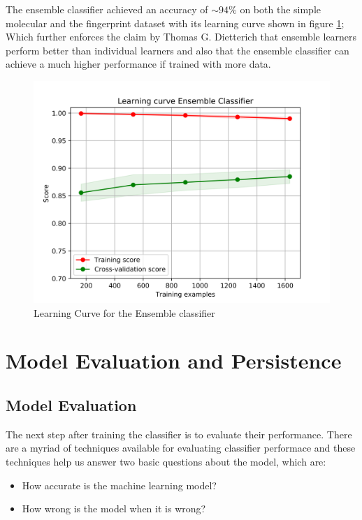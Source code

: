 \documentclass[a4paper,12pt]{report}
\begin{document}
		The ensemble classifier achieved an accuracy of $\sim94\%$ on both the simple molecular and the fingerprint dataset with its learning curve shown in figure \ref{fig:learning_curve_ensemble}; Which further enforces the claim by Thomas G. Dietterich \cite{Dietterich} that ensemble learners perform better than individual learners and also that the ensemble classifier can achieve a much higher performance if trained with more data.
			\begin{figure}[H]
				\centering
				\includegraphics[width=\textwidth,scale=1]{images/learning_curve_ensemble_clf}
				\caption{Learning Curve for the Ensemble classifier}
				\label{fig:learning_curve_ensemble}
			\end{figure}
		
		

\chapter{Model Evaluation and Persistence}
	\section{Model Evaluation}
		The next step after training the classifier is to evaluate their performance. There are a myriad of techniques available for evaluating classifier performace and these techniques help us answer two basic questions about the model, which are:
			\begin{itemize}
				\item How accurate is the machine learning model?
				\item How wrong is the model when it is wrong?
			\end{itemize}
			
\end{document}

